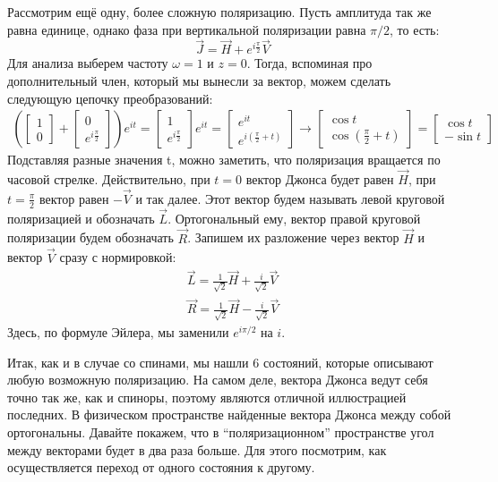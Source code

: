 Рассмотрим ещё одну, более сложную поляризацию. Пусть амплитуда так же равна единице, однако фаза при вертикальной поляризации равна $\pi/2$, то есть:
\[
\Vec{J} = \Vec{H} + e^{i\frac{\pi}{2}}\Vec{V}
\]
Для анализа выберем частоту $\omega = 1$ и $z = 0$. Тогда, вспоминая про дополнительный член, который мы вынесли за вектор, можем сделать следующую цепочку преобразований:
\begin{align*}
(\begin{bmatrix} 1 \\ 0 \end{bmatrix} + \begin{bmatrix} 0 \\ e^{i\frac{\pi}{2}} \end{bmatrix})e^{it} = \begin{bmatrix} 1 \\ e^{i\frac{\pi}{2}} \end{bmatrix} e^{it} = \begin{bmatrix} e^{it} \\ e^{i(\frac{\pi}{2} + t)} \end{bmatrix} \rightarrow \begin{bmatrix} \cos t \\ \cos(\frac{\pi}{2} + t) \end{bmatrix} = \begin{bmatrix} \cos t \\ -\sin t \end{bmatrix}
\end{align*}
Подставляя разные значения t, можно заметить, что поляризация вращается по часовой стрелке. Действительно, при $t = 0$ вектор Джонса будет равен $\Vec{H}$, при $t = \frac{\pi}{2}$ вектор равен $-\Vec{V}$ и так далее. Этот вектор будем называть левой круговой поляризацией и обозначать $\Vec{L}$. Ортогональный ему, вектор правой круговой поляризации будем обозначать $\Vec{R}$. Запишем их разложение через вектор $\Vec{H}$ и вектор $\Vec{V}$ сразу с нормировкой:
\begin{gather*}
    \Vec{L} = \frac{1}{\sqrt{2}}\Vec{H} + \frac{i}{\sqrt{2}}\Vec{V}\\
    \Vec{R} = \frac{1}{\sqrt{2}}\Vec{H} - \frac{i}{\sqrt{2}}\Vec{V}
\end{gather*}
Здесь, по формуле Эйлера, мы заменили $e^{i\pi/2}$ на $i$.

Итак, как и в случае со спинами, мы нашли 6 состояний, которые описывают любую возможную поляризацию. На самом деле, вектора Джонса ведут себя точно так же, как и спиноры, поэтому являются отличной иллюстрацией последних. В физическом пространстве найденные вектора Джонса между собой ортогональны. Давайте покажем, что в ``поляризационном'' пространстве угол между векторами будет в два раза больше. Для этого посмотрим, как осуществляется переход от одного состояния к другому.
